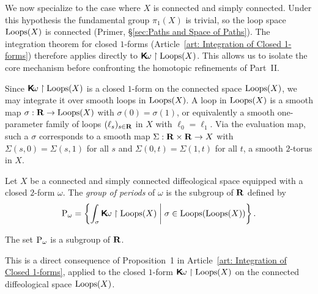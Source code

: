 \documentclass[10pt,reqno,letterpaper,twoside]{amsbook}
\begin{document}
  \begin{article}
    \label{art:group-of-periods}
    We now specialize to the case where $X$ is connected and simply connected.
    Under this hypothesis the fundamental group $\pi_1(X)$ is trivial,
    so the loop space $\operatorname{Loops}(X)$ is connected
    (Primer, \S\ref{sec:Paths and Space of Paths}).
    The integration theorem for closed $1$-forms
    (Article~\ref{art: Integration of Closed 1-forms})
    therefore applies directly to
    $\boldsymbol{\mathsf{K}}\!\omega \restriction \operatorname{Loops}(X)$.
    This allows us to isolate the core mechanism
    before confronting the homotopic refinements of Part~II.
    
    Since $\boldsymbol{\mathsf{K}}\!\omega \restriction \operatorname{Loops}(X)$ is a closed $1$-form
    on the connected space $\operatorname{Loops}(X)$,
    we may integrate it over smooth loops in $\operatorname{Loops}(X)$.
    A loop in $\operatorname{Loops}(X)$ is a smooth map
    $\sigma: {\mathbf{R}} \to \operatorname{Loops}(X)$ with $\sigma(0) = \sigma(1)$,
    or equivalently a smooth one-parameter family of loops
    $(\ell_s)_{s \in {\mathbf{R}}}$ in $X$ with $\ell_0 = \ell_1$.
    Via the evaluation map,
    such a $\sigma$ corresponds to a smooth map
    $\Sigma: {\mathbf{R}} \times {\mathbf{R}} \to X$
    with $\Sigma(s,0) = \Sigma(s,1)$ for all $s$
    and $\Sigma(0,t) = \Sigma(1,t)$ for all $t$,
    \ie a smooth $2$-torus in $X$.
    
    \begin{definition}
      Let $X$ be a connected and simply connected diffeological space
      equipped with a closed $2$-form $\omega$.
      The \emph{group of periods} of $\omega$ is the subgroup of ${\mathbf{R}}$ defined by
      \[
        \operatorname{P}_\omega = \left\{
        \int_\sigma \boldsymbol{\mathsf{K}}\!\omega \restriction \operatorname{Loops}(X)
        \;\middle|\;
        \sigma \in \operatorname{Loops}(\operatorname{Loops}(X))
        \right\}.
        \]%
    \end{definition}
    
    \begin{proposition}
      The set $\operatorname{P}_\omega$ is a subgroup of ${\mathbf{R}}$.
    \end{proposition}
    
    This is a direct consequence of Proposition~1 in Article~\ref{art: Integration of Closed 1-forms},
    applied to the closed $1$-form $\boldsymbol{\mathsf{K}}\!\omega \restriction \operatorname{Loops}(X)$ on the connected diffeological space $\operatorname{Loops}(X)$.
    

\end{article}
\end{document}
